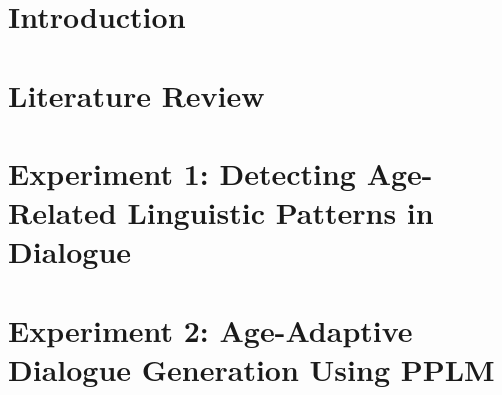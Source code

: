 \documentclass{report}
\begin{document}
\chapter{Introduction}


\chapter{Literature Review}


\chapter{Experiment 1: Detecting Age-Related Linguistic Patterns in Dialogue}\label{ch:experiment1}










\chapter{Experiment 2: Age-Adaptive Dialogue Generation Using PPLM}\label{ch:experiment2}



% 





% 


% 


% 
\end{document}

